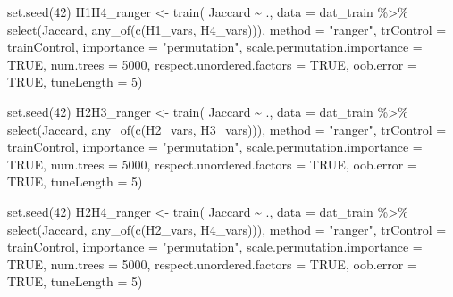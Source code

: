 \documentclass[
  letterpaper,
  DIV=11,
  numbers=noendperiod]{scrreprt}
\newenvironment{Shaded}{\begin{snugshade}}{\end{snugshade}}
\newcommand{\AttributeTok}[1]{\textcolor[rgb]{0.40,0.45,0.13}{#1}}
\newcommand{\ConstantTok}[1]{\textcolor[rgb]{0.56,0.35,0.01}{#1}}
\newcommand{\DecValTok}[1]{\textcolor[rgb]{0.68,0.00,0.00}{#1}}
\newcommand{\FunctionTok}[1]{\textcolor[rgb]{0.28,0.35,0.67}{#1}}
\newcommand{\NormalTok}[1]{\textcolor[rgb]{0.00,0.23,0.31}{#1}}
\newcommand{\OtherTok}[1]{\textcolor[rgb]{0.00,0.23,0.31}{#1}}
\newcommand{\SpecialCharTok}[1]{\textcolor[rgb]{0.37,0.37,0.37}{#1}}
\newcommand{\StringTok}[1]{\textcolor[rgb]{0.13,0.47,0.30}{#1}}
\begin{document}
\begin{Shaded}
\begin{Highlighting}[]
\FunctionTok{set.seed}\NormalTok{(}\DecValTok{42}\NormalTok{)}
\NormalTok{H1H4\_ranger }\OtherTok{\textless{}{-}} \FunctionTok{train}\NormalTok{(}
\NormalTok{    Jaccard }\SpecialCharTok{\textasciitilde{}}\NormalTok{ .,}
    \AttributeTok{data =}\NormalTok{ dat\_train }\SpecialCharTok{\%\textgreater{}\%} \FunctionTok{select}\NormalTok{(Jaccard, }\FunctionTok{any\_of}\NormalTok{(}\FunctionTok{c}\NormalTok{(H1\_vars, H4\_vars))),}
    \AttributeTok{method =} \StringTok{"ranger"}\NormalTok{,}
    \AttributeTok{trControl =}\NormalTok{ trainControl,}
    \AttributeTok{importance =} \StringTok{"permutation"}\NormalTok{,}
    \AttributeTok{scale.permutation.importance =} \ConstantTok{TRUE}\NormalTok{,}
    \AttributeTok{num.trees =} \DecValTok{5000}\NormalTok{,}
    \AttributeTok{respect.unordered.factors =} \ConstantTok{TRUE}\NormalTok{,}
    \AttributeTok{oob.error =} \ConstantTok{TRUE}\NormalTok{,}
    \AttributeTok{tuneLength =} \DecValTok{5}\NormalTok{)}


\FunctionTok{set.seed}\NormalTok{(}\DecValTok{42}\NormalTok{)}
\NormalTok{H2H3\_ranger }\OtherTok{\textless{}{-}} \FunctionTok{train}\NormalTok{(}
\NormalTok{    Jaccard }\SpecialCharTok{\textasciitilde{}}\NormalTok{ .,}
    \AttributeTok{data =}\NormalTok{ dat\_train }\SpecialCharTok{\%\textgreater{}\%} \FunctionTok{select}\NormalTok{(Jaccard, }\FunctionTok{any\_of}\NormalTok{(}\FunctionTok{c}\NormalTok{(H2\_vars, H3\_vars))),}
    \AttributeTok{method =} \StringTok{"ranger"}\NormalTok{,}
    \AttributeTok{trControl =}\NormalTok{ trainControl,}
    \AttributeTok{importance =} \StringTok{"permutation"}\NormalTok{,}
    \AttributeTok{scale.permutation.importance =} \ConstantTok{TRUE}\NormalTok{,}
    \AttributeTok{num.trees =} \DecValTok{5000}\NormalTok{,}
    \AttributeTok{respect.unordered.factors =} \ConstantTok{TRUE}\NormalTok{,}
    \AttributeTok{oob.error =} \ConstantTok{TRUE}\NormalTok{,}
    \AttributeTok{tuneLength =} \DecValTok{5}\NormalTok{)}


\FunctionTok{set.seed}\NormalTok{(}\DecValTok{42}\NormalTok{)}
\NormalTok{H2H4\_ranger }\OtherTok{\textless{}{-}} \FunctionTok{train}\NormalTok{(}
\NormalTok{    Jaccard }\SpecialCharTok{\textasciitilde{}}\NormalTok{ .,}
    \AttributeTok{data =}\NormalTok{ dat\_train }\SpecialCharTok{\%\textgreater{}\%} \FunctionTok{select}\NormalTok{(Jaccard, }\FunctionTok{any\_of}\NormalTok{(}\FunctionTok{c}\NormalTok{(H2\_vars, H4\_vars))),}
    \AttributeTok{method =} \StringTok{"ranger"}\NormalTok{,}
    \AttributeTok{trControl =}\NormalTok{ trainControl,}
    \AttributeTok{importance =} \StringTok{"permutation"}\NormalTok{,}
    \AttributeTok{scale.permutation.importance =} \ConstantTok{TRUE}\NormalTok{,}
    \AttributeTok{num.trees =} \DecValTok{5000}\NormalTok{,}
    \AttributeTok{respect.unordered.factors =} \ConstantTok{TRUE}\NormalTok{,}
    \AttributeTok{oob.error =} \ConstantTok{TRUE}\NormalTok{,}
    \AttributeTok{tuneLength =} \DecValTok{5}\NormalTok{)}


\end{Highlighting}
\end{Shaded}
\end{document}
